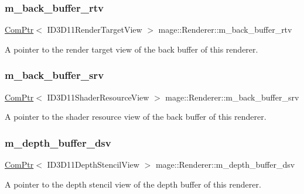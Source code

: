 \subsubsection{\texorpdfstring{m\+\_\+back\+\_\+buffer\+\_\+rtv}{m\_back\_buffer\_rtv}}
{\footnotesize\ttfamily \hyperlink{namespacemage_ae74f374780900893caa5555d1031fd79}{Com\+Ptr}$<$ I\+D3\+D11\+Render\+Target\+View $>$ mage\+::\+Renderer\+::m\+\_\+back\+\_\+buffer\+\_\+rtv\hspace{0.3cm}{\ttfamily [private]}}

A pointer to the render target view of the back buffer of this renderer. \hypertarget{classmage_1_1_renderer_adddf1283111a3c43a7957411688136b8}{}\label{classmage_1_1_renderer_adddf1283111a3c43a7957411688136b8} 
\subsubsection{\texorpdfstring{m\+\_\+back\+\_\+buffer\+\_\+srv}{m\_back\_buffer\_srv}}
{\footnotesize\ttfamily \hyperlink{namespacemage_ae74f374780900893caa5555d1031fd79}{Com\+Ptr}$<$ I\+D3\+D11\+Shader\+Resource\+View $>$ mage\+::\+Renderer\+::m\+\_\+back\+\_\+buffer\+\_\+srv\hspace{0.3cm}{\ttfamily [private]}}

A pointer to the shader resource view of the back buffer of this renderer. \hypertarget{classmage_1_1_renderer_a8f5a70294790d4fbbb8237c587f88bb5}{}\label{classmage_1_1_renderer_a8f5a70294790d4fbbb8237c587f88bb5} 
\subsubsection{\texorpdfstring{m\+\_\+depth\+\_\+buffer\+\_\+dsv}{m\_depth\_buffer\_dsv}}
{\footnotesize\ttfamily \hyperlink{namespacemage_ae74f374780900893caa5555d1031fd79}{Com\+Ptr}$<$ I\+D3\+D11\+Depth\+Stencil\+View $>$ mage\+::\+Renderer\+::m\+\_\+depth\+\_\+buffer\+\_\+dsv\hspace{0.3cm}{\ttfamily [private]}}

A pointer to the depth stencil view of the depth buffer of this renderer. \hypertarget{classmage_1_1_renderer_ac5b85fc464bceb434748d8a44243788c}{}\label{classmage_1_1_renderer_ac5b85fc464bceb434748d8a44243788c} 
